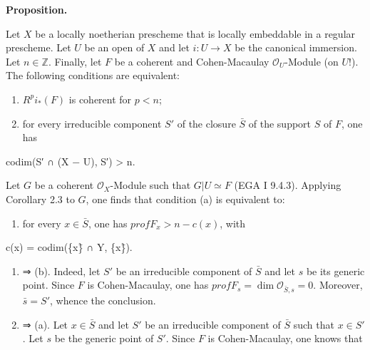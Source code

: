 \documentclass[
  11pt,
  a4paper,
]{book}
\newenvironment{Shaded}{}{}
\newcommand{\NormalTok}[1]{#1}
\providecommand{\tightlist}{%
  \setlength{\itemsep}{0pt}\setlength{\parskip}{0pt}}
\begin{document}
\textbf{Proposition.}

Let \(X\) be a locally noetherian prescheme that is locally embeddable
in a regular prescheme. Let \(U\) be an open of \(X\) and let
\(i : U \to X\) be the canonical immersion. Let \(n \in \mathbb{Z}\).
Finally, let \(F\) be a coherent and Cohen-Macaulay
\(\mathcal{O}_{U}\)-Module (on \(U\)!). The following conditions are
equivalent:

\begin{enumerate}
\def\labelenumi{(\alph{enumi})}
\item
  \(R^{p} i_{*}(F)\) is coherent for \(p < n\);
\item
  for every irreducible component \(S'\) of the closure \(\bar{S}\) of
  the support \(S\) of \(F\), one has
\end{enumerate}

\begin{Shaded}
\begin{Highlighting}[]
\NormalTok{codim(S′ ∩ (X − U), S′) \textgreater{} n.}
\end{Highlighting}
\end{Shaded}

Let \(G\) be a coherent \(\mathcal{O}_{X}\)-Module such that
\(G|U \simeq F\) (EGA I 9.4.3). Applying Corollary 2.3 to \(G\), one
finds that condition (a) is equivalent to:

\begin{enumerate}
\def\labelenumi{(\alph{enumi})}
\setcounter{enumi}{2}
\tightlist
\item
  for every \(x \in \bar{S}\), one has \(prof F_{x} > n - c(x)\), with
\end{enumerate}

\begin{Shaded}
\begin{Highlighting}[]
\NormalTok{c(x) = codim(\{x\}̄ ∩ Y, \{x\}̄).}
\end{Highlighting}
\end{Shaded}

\begin{enumerate}
\def\labelenumi{(\alph{enumi})}
\item
  ⇒ (b). Indeed, let \(S'\) be an irreducible component of \(\bar{S}\)
  and let \(s\) be its generic point. Since \(F\) is Cohen-Macaulay, one
  has \(prof F_{s} = \dim \mathcal{O}_{\bar{S}, s} = 0\). Moreover,
  \(\bar{s} = S'\), whence the conclusion.
\item
  ⇒ (a). Let \(x \in \bar{S}\) and let \(S'\) be an irreducible
  component of \(\bar{S}\) such that \(x \in S'\). Let \(s\) be the
  generic point of \(S'\). Since \(F\) is Cohen-Macaulay, one knows that
\end{enumerate}
\end{document}

